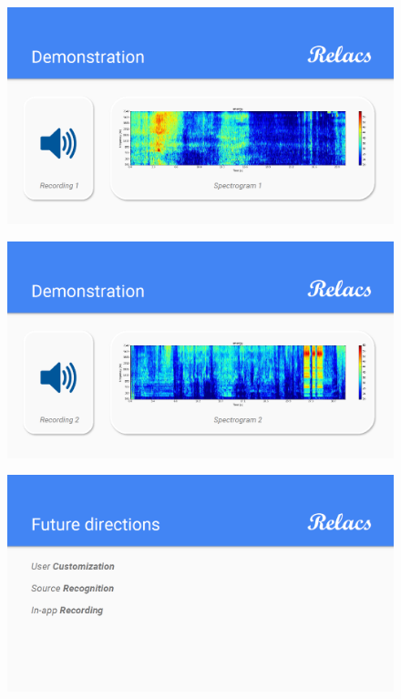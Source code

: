 \documentclass[a4paper]{article}
\begin{document}
\begin{figure}[h]
\centering
\includegraphics[width=\linewidth]{./Slide7}
\caption{}
\label{fig:Slide7}
\end{figure}

\begin{figure}[h]
\centering
\includegraphics[width=\linewidth]{./Slide8}
\caption{}
\label{fig:Slide8}
\end{figure}

\begin{figure}[h]
\centering
\includegraphics[width=\linewidth]{./Slide9}
\caption{}
\label{fig:Slide9}
\end{figure}
\end{document}
